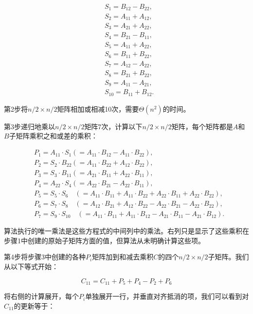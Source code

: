 \documentclass[lang=cn,newtx,10pt,scheme=chinese]{elegantbook}
\begin{document}
$$
\begin{aligned}
& S_1=B_{12}-B_{22}, \\
& S_2=A_{11}+A_{12}, \\
& S_3=A_{21}+A_{22}, \\
& S_4=B_{21}-B_{11}, \\
& S_5=A_{11}+A_{22}, \\
& S_6=B_{11}+B_{22}, \\
& S_7=A_{12}-A_{22}, \\
& S_8=B_{21}+B_{22}, \\
& S_9=A_{11}-A_{21}, \\
& S_{10}=B_{11}+B_{12} .
\end{aligned}
$$

第2步将$n/2\times n/2$矩阵相加或相减10次，需要$\Theta\left(n^2\right)$的时间。

第3步递归地乘以$n/2\times n/2$矩阵7次，计算以下$n/2\times n/2$矩阵，每个矩阵都是$A$和$B$子矩阵乘积之和或差的乘积：

$$
\begin{aligned}
& P_1=A_{11} \cdot S_1\left(=A_{11} \cdot B_{12}-A_{11} \cdot B_{22}\right), \\
& P_2=S_2 \cdot B_{22}\left(=A_{11} \cdot B_{22}+A_{12} \cdot B_{22}\right), \\
& P_3=S_3 \cdot B_{11}\left(=A_{21} \cdot B_{11}+A_{22} \cdot B_{11}\right), \\
& P_4=A_{22} \cdot S_4\left(=A_{22} \cdot B_{21}-A_{22} \cdot B_{11}\right), \\
& P_5=S_5 \cdot S_6 \quad\left(=A_{11} \cdot B_{11}+A_{11} \cdot B_{22}+A_{22} \cdot B_{11}+A_{22} \cdot B_{22}\right), \\
& P_6=S_7 \cdot S_8 \quad\left(=A_{12} \cdot B_{21}+A_{12} \cdot B_{22}-A_{22} \cdot B_{21}-A_{22} \cdot B_{22}\right), \\
& P_7=S_9 \cdot S_{10} \quad\left(=A_{11} \cdot B_{11}+A_{11} \cdot B_{12}-A_{21} \cdot B_{11}-A_{21} \cdot B_{12}\right) .
\end{aligned}
$$

算法执行的唯一乘法是这些方程式的中间列中的乘法。右列只是显示了这些乘积在步骤1中创建的原始子矩阵方面的值，但算法从未明确计算这些项。

第4步将步骤3中创建的各种$P_i$矩阵加到和减去乘积$C$的四个$n/2\times n/2$子矩阵。我们从以下等式开始：

$$
C_{11}=C_{11}+P_5+P_4-P_2+P_6
$$

将右侧的计算展开，每个$P_i$单独展开一行，并垂直对齐抵消的项，我们可以看到对$C_{11}$的更新等于：
\end{document}
